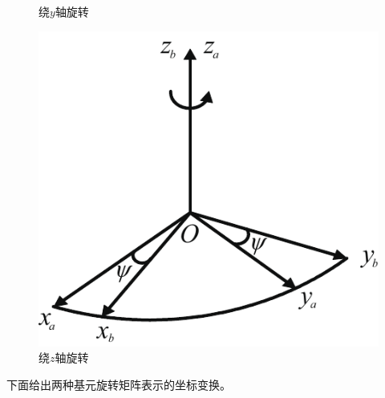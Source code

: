 \begin{figure}[!htb]
\begin{minipage}{0.3\linewidth}
		\caption{绕$y$轴旋转}
		\label{y}
	\end{minipage}
	\begin{minipage}{0.34\linewidth}
		\centering
		\includegraphics[width=0.85\linewidth]{pic/z}
		\vspace*{-0.5em}
		\caption{绕$z$轴旋转}
		\label{z}
	\end{minipage}
\end{figure}

下面给出两种基元旋转矩阵表示的坐标变换。
\vspace*{0.5em}


